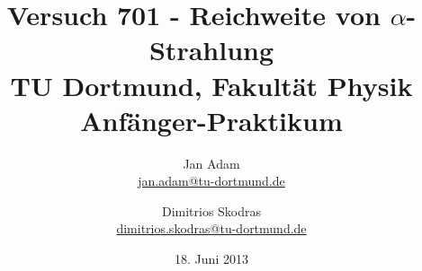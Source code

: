 



\title{Versuch 701 - Reichweite von $\alpha$-Strahlung\\				%
\large TU Dortmund, Fakultät Physik\\ 
\normalsize Anfänger-Praktikum}

\author{Jan Adam\\			%
{\small \href{jan.adam@tu-dortmund.de}{jan.adam@tu-dortmund.de}}	%
\and						%
Dimitrios Skodras\\					%
{\small \href{dimitrios.skodras@tu-dortmund.de}{dimitrios.skodras@tu-dortmund.de}}		%
}
\date{18. Juni 2013}				%





\maketitle					%
\thispagestyle{empty} 				%



\tableofcontents


\newpage					%


